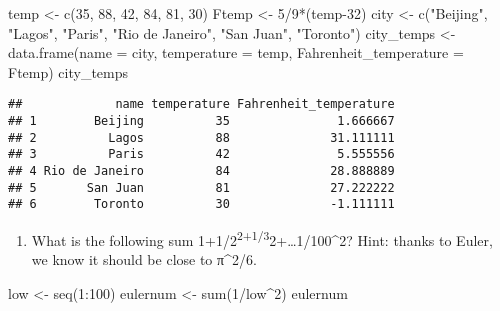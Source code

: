 \documentclass[
]{article}
\newenvironment{Shaded}{\begin{snugshade}}{\end{snugshade}}
\newcommand{\AttributeTok}[1]{\textcolor[rgb]{0.77,0.63,0.00}{#1}}
\newcommand{\DecValTok}[1]{\textcolor[rgb]{0.00,0.00,0.81}{#1}}
\newcommand{\FunctionTok}[1]{\textcolor[rgb]{0.00,0.00,0.00}{#1}}
\newcommand{\NormalTok}[1]{#1}
\newcommand{\OtherTok}[1]{\textcolor[rgb]{0.56,0.35,0.01}{#1}}
\newcommand{\SpecialCharTok}[1]{\textcolor[rgb]{0.00,0.00,0.00}{#1}}
\newcommand{\StringTok}[1]{\textcolor[rgb]{0.31,0.60,0.02}{#1}}
\providecommand{\tightlist}{%
  \setlength{\itemsep}{0pt}\setlength{\parskip}{0pt}}
\begin{document}
\begin{Shaded}
\begin{Highlighting}[]
\NormalTok{temp }\OtherTok{\textless{}{-}} \FunctionTok{c}\NormalTok{(}\DecValTok{35}\NormalTok{, }\DecValTok{88}\NormalTok{, }\DecValTok{42}\NormalTok{, }\DecValTok{84}\NormalTok{, }\DecValTok{81}\NormalTok{, }\DecValTok{30}\NormalTok{)}
\NormalTok{Ftemp }\OtherTok{\textless{}{-}} \DecValTok{5}\SpecialCharTok{/}\DecValTok{9}\SpecialCharTok{*}\NormalTok{(temp}\DecValTok{{-}32}\NormalTok{)}
\NormalTok{city }\OtherTok{\textless{}{-}} \FunctionTok{c}\NormalTok{(}\StringTok{"Beijing"}\NormalTok{, }\StringTok{"Lagos"}\NormalTok{, }\StringTok{"Paris"}\NormalTok{, }\StringTok{"Rio de Janeiro"}\NormalTok{, }
          \StringTok{"San Juan"}\NormalTok{, }\StringTok{"Toronto"}\NormalTok{)}
\NormalTok{city\_temps }\OtherTok{\textless{}{-}} \FunctionTok{data.frame}\NormalTok{(}\AttributeTok{name =}\NormalTok{ city, }\AttributeTok{temperature =}\NormalTok{ temp, }\AttributeTok{Fahrenheit\_temperature =}\NormalTok{ Ftemp)}
\NormalTok{city\_temps}
\end{Highlighting}
\end{Shaded}

\begin{verbatim}
##             name temperature Fahrenheit_temperature
## 1        Beijing          35               1.666667
## 2          Lagos          88              31.111111
## 3          Paris          42               5.555556
## 4 Rio de Janeiro          84              28.888889
## 5       San Juan          81              27.222222
## 6        Toronto          30              -1.111111
\end{verbatim}

\begin{enumerate}
\def\labelenumi{\arabic{enumi}.}
\setcounter{enumi}{1}
\tightlist
\item
  What is the following sum
  1+1/2\textsuperscript{2+1/3}2+\ldots1/100\^{}2? Hint: thanks to Euler,
  we know it should be close to π\^{}2/6.
\end{enumerate}

\begin{Shaded}
\begin{Highlighting}[]
\NormalTok{low }\OtherTok{\textless{}{-}} \FunctionTok{seq}\NormalTok{(}\DecValTok{1}\SpecialCharTok{:}\DecValTok{100}\NormalTok{)}
\NormalTok{eulernum }\OtherTok{\textless{}{-}} \FunctionTok{sum}\NormalTok{(}\DecValTok{1}\SpecialCharTok{/}\NormalTok{low}\SpecialCharTok{\^{}}\DecValTok{2}\NormalTok{)}
\NormalTok{eulernum}
\end{Highlighting}
\end{Shaded}
\end{document}
